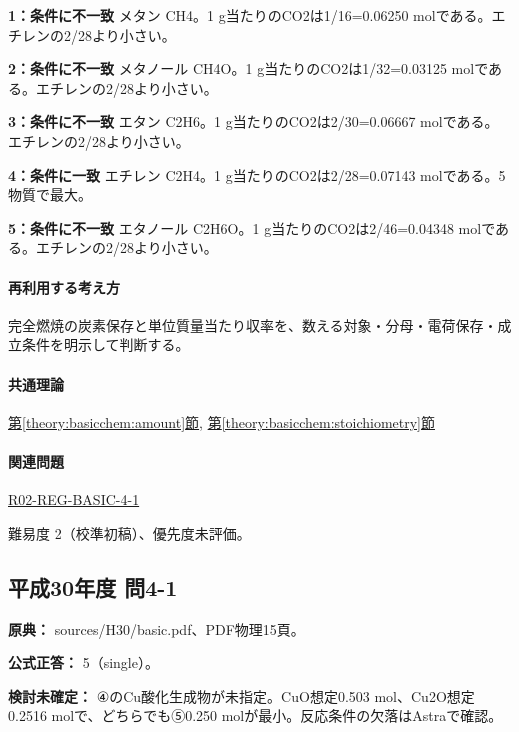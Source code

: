 \noindent\textbf{1：条件に不一致} メタン CH4。1 g当たりのCO2は1/16=\allowbreak{}0.06250 molである。エチレンの2/28より小さい。\par

\noindent\textbf{2：条件に不一致} メタノール CH4O。1 g当たりのCO2は1/32=\allowbreak{}0.03125 molである。エチレンの2/28より小さい。\par

\noindent\textbf{3：条件に不一致} エタン C2H6。1 g当たりのCO2は2/30=\allowbreak{}0.06667 molである。エチレンの2/28より小さい。\par

\noindent\textbf{4：条件に一致} エチレン C2H4。1 g当たりのCO2は2/28=\allowbreak{}0.07143 molである。5物質で最大。\par

\noindent\textbf{5：条件に不一致} エタノール C2H6O。1 g当たりのCO2は2/46=\allowbreak{}0.04348 molである。エチレンの2/28より小さい。\par

\paragraph{再利用する考え方} 完全燃焼の炭素保存と単位質量当たり収率を、数える対象・分母・電荷保存・成立条件を明示して判断する。

\paragraph{共通理論} \hyperref[theory:basicchem:amount]{第\ref*{theory:basicchem:amount}節}, \hyperref[theory:basicchem:stoichiometry]{第\ref*{theory:basicchem:stoichiometry}節}

\paragraph{関連問題} \hyperref[q:r02-reg-basic-4-1]{R02-REG-BASIC-4-1}

\par 難易度 2（校準初稿）、優先度未評価。

\subsection{平成30年度 問4-1}
\label{q:h30-reg-basic-4-1}

\noindent\textbf{原典：} sources/H30/basic.pdf、PDF物理15頁。

\textbf{公式正答：} 5（single）。

\par\textbf{検討未確定：} ④のCu酸化生成物が未指定。CuO想定0.503 mol、Cu2O想定0.2516 molで、どちらでも⑤0.250 molが最小。反応条件の欠落はAstraで確認。

